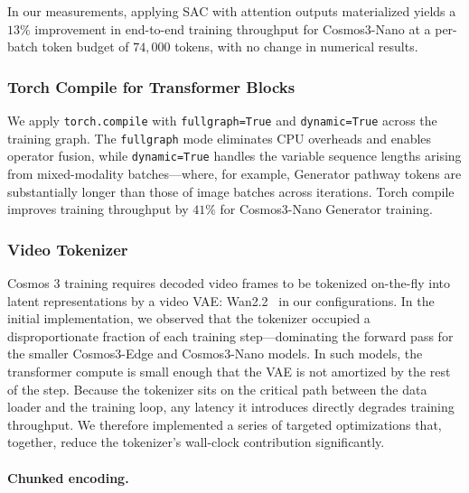 In our measurements, applying SAC with attention outputs materialized yields a $13\%$ improvement in end-to-end training throughput for Cosmos3-Nano at a per-batch token budget of $74{,}000$ tokens, with no change in numerical results.

\subsubsection{Torch Compile for Transformer Blocks}

We apply \texttt{torch.compile} with \texttt{fullgraph=True} and \texttt{dynamic=True} across the training graph. The \texttt{fullgraph} mode eliminates CPU overheads and enables operator fusion, while \texttt{dynamic=True} handles the variable sequence lengths arising from mixed-modality batches---where, for example, Generator pathway tokens are substantially longer than those of image batches across iterations. Torch compile improves training throughput by $41\%$ for Cosmos3-Nano Generator training.

\subsubsection{Video Tokenizer}

Cosmos 3 training requires decoded video frames to be tokenized on-the-fly into latent representations by a video VAE: Wan2.2~\citep{wan2pt2} in our configurations. In the initial implementation, we observed that the tokenizer occupied a disproportionate fraction of each training step---dominating the forward pass for the smaller Cosmos3-Edge and Cosmos3-Nano models. In such models, the transformer compute is small enough that the VAE is not amortized by the rest of the step. Because the tokenizer sits on the critical path between the data loader and the training loop, any latency it introduces directly degrades training throughput. We therefore implemented a series of targeted optimizations that, together, reduce the tokenizer's wall-clock contribution significantly.

\paragraph{Chunked encoding.}

